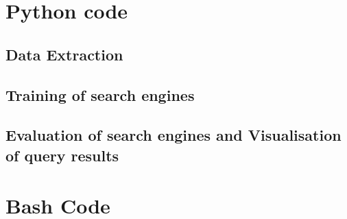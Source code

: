 \documentclass [14 pt]{article}
\begin{document}
\newpage
\appendix

\section{Python code}

\subsection{Data Extraction}

\subsection{Training of search engines}

\subsection{Evaluation of search engines and Visualisation of query results}

\newpage

\section{Bash Code} 

\end{document}
